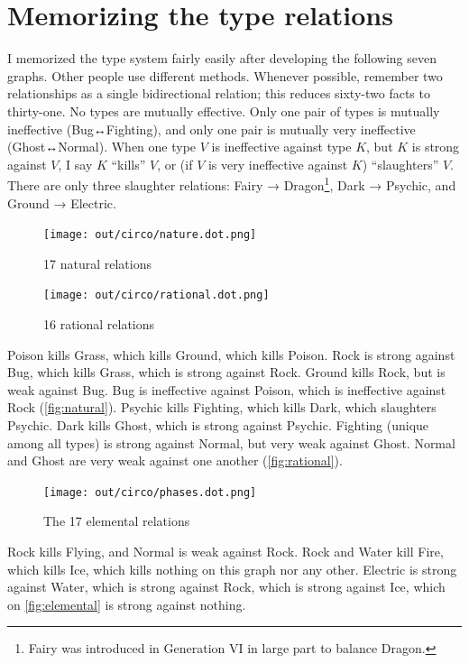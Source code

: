 \section{Memorizing the type relations}
I memorized the type system fairly easily after developing the following seven graphs.
Other people use different methods.
Whenever possible, remember two relationships as a single bidirectional relation;
  this reduces sixty-two facts to thirty-one.
No types are mutually effective.
Only one pair of types is mutually ineffective (Bug↔Fighting),
  and only one pair is mutually very ineffective (Ghost↔Normal).
When one type $V$ is ineffective against type $K$, but $K$ is strong
 against $V$, I say $K$ ``kills'' $V$, or
 (if $V$ is very ineffective against $K$) ``slaughters'' $V$.
There are only three slaughter relations: Fairy → Dragon\footnote{Fairy was
  introduced in Generation VI in large part to balance Dragon.}, Dark → Psychic,
  and Ground → Electric.

\begin{figure}[h!]
\begin{minipage}[t]{0.5\textwidth}
\centering
\texttt{[image: out/circo/nature.dot.png]}
\caption{17 natural relations\label{fig:natural}}
\end{minipage}
\begin{minipage}[t]{0.5\textwidth}
\centering
\texttt{[image: out/circo/rational.dot.png]}
\caption{16 rational relations\label{fig:rational}}
\end{minipage}
\end{figure}
\noindent{}Poison kills Grass, which kills Ground, which kills Poison.
Rock is strong against Bug, which kills Grass, which is strong against Rock.
Ground kills Rock, but is weak against Bug.
Bug is ineffective against Poison, which is ineffective against Rock (\autoref{fig:natural}).
Psychic kills Fighting, which kills Dark, which slaughters Psychic.
Dark kills Ghost, which is strong against Psychic.
Fighting (unique among all types) is strong against Normal,
  but very weak against Ghost.
Normal and Ghost are very weak against one another (\autoref{fig:rational}).

\begin{figure}[ht]
\centering
\texttt{[image: out/circo/phases.dot.png]}
\caption{The 17 elemental relations\label{fig:elemental}}
\end{figure}
\noindent{}Rock kills Flying, and Normal is weak against Rock.
Rock and Water kill Fire, which kills Ice, which kills nothing on this graph nor any other.
Electric is strong against Water, which is strong against Rock, which is strong against Ice,
 which on \autoref{fig:elemental} is strong against nothing.
\clearpage

